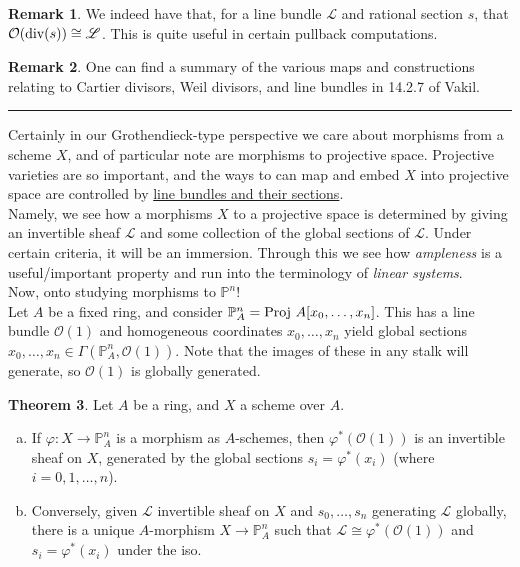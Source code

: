 \documentclass[10pt,reqno]{amsart}
\theoremstyle{definition}
\newtheorem{theorem}{Theorem}
\newtheorem{remark}[theorem]{Remark}
\theoremstyle{remark}
\numberwithin{equation}{section}
\numberwithin{theorem}{section}
\newcommand{\OO}{{\mathcal O}}
\newcommand{\ddiv}{\textup{div}}
\newcommand{\proj}{\textup{Proj }}
\newcommand{\LL}{{\mathscr L}}
\newcommand{\PP}{{\mathbb P}}
\begin{document}

\begin{remark}
We indeed have that, for a line bundle $\LL$ and rational section $s$, that $\OO(\ddiv(s)) \cong \LL$. This is quite useful in certain pullback computations.
\end{remark}

\begin{remark} One can find a summary of the various maps and constructions relating to Cartier divisors, Weil divisors, and line bundles in 14.2.7 of Vakil.
\end{remark}

\hrule
\vspace{1em}


Certainly in our Grothendieck-type perspective we care about morphisms from a scheme $X$, and of particular note are morphisms to projective space. Projective varieties are so important, and the ways to can map and embed $X$ into projective space are controlled by \underline{line bundles and their sections}.
\\

Namely, we see how a morphisms $X$ to a projective space is determined by giving an invertible sheaf $\LL$ and some collection of the global sections of $\LL$. Under certain criteria, it will be an immersion. Through this we see how \textit{ampleness} is a useful/important property and run into the terminology of \textit{linear systems}.
\\

Now, onto studying morphisms to $\PP^n$!
\\

Let $A$ be a fixed ring, and consider $\PP^n_A = \proj A[x_0,\dots,x_n]$. This has a line bundle $\OO(1)$ and homogeneous coordinates $x_0,\dots,x_n$ yield global sections $x_0,\dots,x_n \in \Gamma(\PP^n_A, \OO(1))$. Note that the images of these in any stalk will generate, so $\OO(1)$ is globally generated.

\begin{theorem} Let $A$ be a ring, and $X$ a scheme over $A$.
\begin{enumerate}[(a)]
\item If $\varphi: X \to \PP^n_A$ is a morphism as $A$-schemes, then $\varphi^*(\OO(1))$ is an invertible sheaf on $X$, generated by the global sections $s_i = \varphi^*(x_i)$ (where $i = 0,1,\dots,n$).
\item Conversely, given $\LL$ invertible sheaf on $X$ and $s_0,\dots,s_n$ generating $\LL$ globally, there is a unique $A$-morphism $X \to \PP^n_A$ such that $\LL \cong \varphi^*(\OO(1))$ and $s_i = \varphi^*(x_i)$ under the iso.
\end{enumerate}
\end{theorem}
\end{document}
